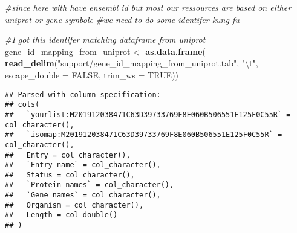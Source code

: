 \documentclass[]{article}
\newenvironment{Shaded}{\begin{snugshade}}{\end{snugshade}}
\newcommand{\CharTok}[1]{\textcolor[rgb]{0.31,0.60,0.02}{#1}}
\newcommand{\CommentTok}[1]{\textcolor[rgb]{0.56,0.35,0.01}{\textit{#1}}}
\newcommand{\DataTypeTok}[1]{\textcolor[rgb]{0.13,0.29,0.53}{#1}}
\newcommand{\KeywordTok}[1]{\textcolor[rgb]{0.13,0.29,0.53}{\textbf{#1}}}
\newcommand{\NormalTok}[1]{#1}
\newcommand{\OtherTok}[1]{\textcolor[rgb]{0.56,0.35,0.01}{#1}}
\newcommand{\StringTok}[1]{\textcolor[rgb]{0.31,0.60,0.02}{#1}}
\begin{document}
\begin{Shaded}
\begin{Highlighting}[]
\CommentTok{#since here with have ensembl id but most our ressources are based on either uniprot or gene symbole}
\CommentTok{#we need to do some identifer kung-fu}

\CommentTok{#I got this identifer matching dataframe from uniprot}
\NormalTok{gene_id_mapping_from_uniprot <-}\StringTok{ }\KeywordTok{as.data.frame}\NormalTok{(}
  \KeywordTok{read_delim}\NormalTok{(}\StringTok{"support/gene_id_mapping_from_uniprot.tab"}\NormalTok{, }
                                           \StringTok{"}\CharTok{\textbackslash{}t}\StringTok{"}\NormalTok{, }\DataTypeTok{escape_double =} \OtherTok{FALSE}\NormalTok{, }\DataTypeTok{trim_ws =} \OtherTok{TRUE}\NormalTok{))}
\end{Highlighting}
\end{Shaded}

\begin{verbatim}
## Parsed with column specification:
## cols(
##   `yourlist:M201912038471C63D39733769F8E060B506551E125F0C55R` = col_character(),
##   `isomap:M201912038471C63D39733769F8E060B506551E125F0C55R` = col_character(),
##   Entry = col_character(),
##   `Entry name` = col_character(),
##   Status = col_character(),
##   `Protein names` = col_character(),
##   `Gene names` = col_character(),
##   Organism = col_character(),
##   Length = col_double()
## )
\end{verbatim}
\end{document}
